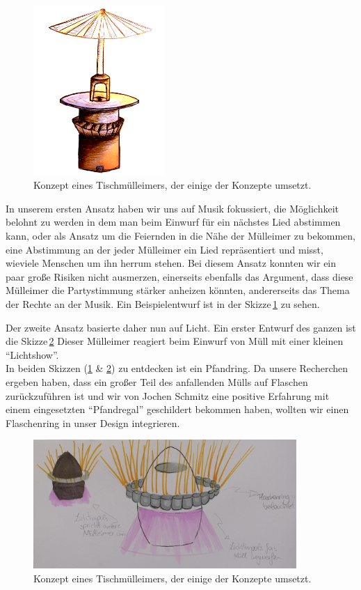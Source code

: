    \begin{figure}[H]
        \centering
        \includegraphics[width=5cm]{media/01_project/sketch_standing_table_bin.png}
        \caption{Konzept eines Tischmülleimers, der einige der Konzepte umsetzt.}
        \label{fig:standing_desk_bin_1}
    \end{figure}

    In unserem ersten Ansatz haben wir uns auf Musik fokussiert, die Möglichkeit belohnt zu werden in dem man beim Einwurf für ein nächstes Lied abstimmen kann, oder als Ansatz um die Feiernden in die Nähe der Mülleimer zu bekommen, eine Abstimmung an der jeder Mülleimer ein Lied repräsentiert und misst, wieviele Menschen um ihn herrum stehen. Bei diesem Ansatz konnten wir ein paar große Risiken nicht ausmerzen, einerseits ebenfalls das Argument, dass diese Mülleimer die Partystimmung stärker anheizen könnten, andererseits das Thema der Rechte an der Musik.
    Ein Beispielentwurf ist in der Skizze\,\ref{fig:standing_desk_bin_1} zu sehen.

    Der zweite Ansatz basierte daher nun auf Licht.
    Ein erster Entwurf des ganzen ist die Skizze\,\ref{fig:light_bin_1}
    Dieser Mülleimer reagiert beim Einwurf von Müll mit einer kleinen \enquote{Lichtshow}.\\

    In beiden Skizzen (\ref{fig:standing_desk_bin_1} \& \ref{fig:light_bin_1}) zu entdecken ist ein Pfandring. Da unsere Recherchen ergeben haben, dass ein großer Teil des anfallenden Mülls auf Flaschen zurückzuführen ist und wir von Jochen Schmitz eine positive Erfahrung mit einem eingesetzten \enquote{Pfandregal} geschildert bekommen haben, wollten wir einen Flaschenring in unser Design integrieren.   

    \begin{figure}[H]
        \centering
        \includegraphics[width=10cm]{media/01_project/sketch_party_bin.jpg}
        \caption{Konzept eines Tischmülleimers, der einige der Konzepte umsetzt.}
        \label{fig:light_bin_1}
    \end{figure}

